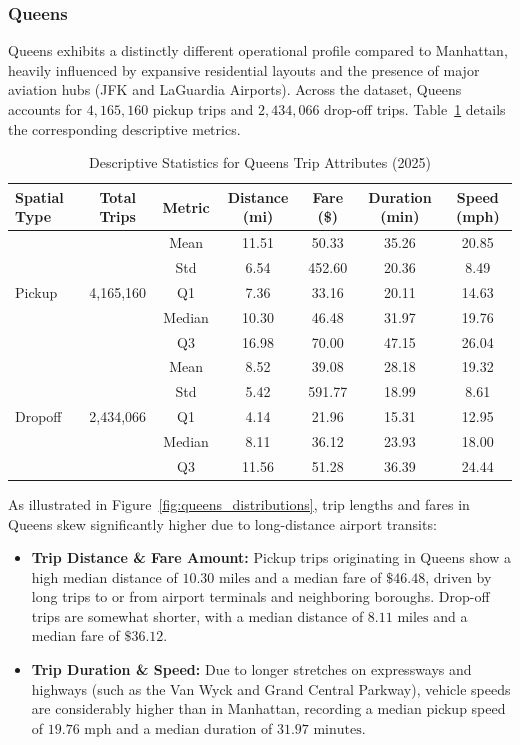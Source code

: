 \documentclass[11pt,a4paper]{article}
\begin{document}
\subsubsection{Queens}
Queens exhibits a distinctly different operational profile compared to Manhattan, heavily influenced by expansive residential layouts and the presence of major aviation hubs (JFK and LaGuardia Airports). Across the dataset, Queens accounts for $4,165,160$ pickup trips and $2,434,066$ drop-off trips. Table~\ref{tab:queens_stats} details the corresponding descriptive metrics.

\begin{table}[htbp]
    \centering
    \caption{Descriptive Statistics for Queens Trip Attributes (2025)}
    \label{tab:queens_stats}
    \small
    \begin{tabular}{lcccccc}
        \toprule
        \textbf{Spatial Type} & \textbf{Total Trips} & \textbf{Metric} & \textbf{Distance (mi)} & \textbf{Fare (\$)} & \textbf{Duration (min)} & \textbf{Speed (mph)} \\
        \midrule
        \multirow{5}{*}{Pickup} & \multirow{5}{*}{4,165,160} 
        & Mean & 11.51 & 50.33 & 35.26 & 20.85 \\
        & & Std & 6.54 & 452.60 & 20.36 & 8.49 \\
        & & Q1 & 7.36 & 33.16 & 20.11 & 14.63 \\
        & & Median & 10.30 & 46.48 & 31.97 & 19.76 \\
        & & Q3 & 16.98 & 70.00 & 47.15 & 26.04 \\
        \midrule
        \multirow{5}{*}{Dropoff} & \multirow{5}{*}{2,434,066} 
        & Mean & 8.52 & 39.08 & 28.18 & 19.32 \\
        & & Std & 5.42 & 591.77 & 18.99 & 8.61 \\
        & & Q1 & 4.14 & 21.96 & 15.31 & 12.95 \\
        & & Median & 8.11 & 36.12 & 23.93 & 18.00 \\
        & & Q3 & 11.56 & 51.28 & 36.39 & 24.44 \\
        \bottomrule
    \end{tabular}
\end{table}

As illustrated in Figure~\ref{fig:queens_distributions}, trip lengths and fares in Queens skew significantly higher due to long-distance airport transits:
\begin{itemize}
    \item \textbf{Trip Distance \& Fare Amount:} Pickup trips originating in Queens show a high median distance of $10.30\text{ miles}$ and a median fare of $\$46.48$, driven by long trips to or from airport terminals and neighboring boroughs. Drop-off trips are somewhat shorter, with a median distance of $8.11\text{ miles}$ and a median fare of $\$36.12$.
    \item \textbf{Trip Duration \& Speed:} Due to longer stretches on expressways and highways (such as the Van Wyck and Grand Central Parkway), vehicle speeds are considerably higher than in Manhattan, recording a median pickup speed of $19.76\text{ mph}$ and a median duration of $31.97\text{ minutes}$.
\end{itemize}
\end{document}
